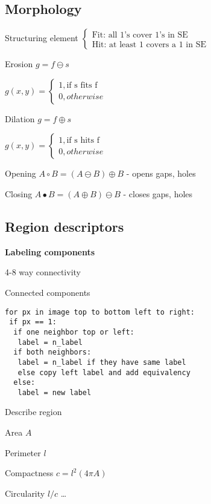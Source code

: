 \documentclass{article}
\begin{document}
\begin{multicols*}{2}
{\subsection{Morphology}

Structuring element
$\begin{cases}
	\text{Fit: all 1's cover 1's in SE} \\
	\text{Hit: at least 1 covers a 1 in SE}
\end{cases}$

\begin{compactitem}
	\item Erosion $g = f \ominus s$
	
	$g(x,y) = \begin{cases}
		1, \text{if s fits f} \\
		0, otherwise
	\end{cases}$

	\item Dilation $g = f \oplus s$
	
	$g(x,y) = \begin{cases}
		1, \text{if s hits f} \\
		0, otherwise
	\end{cases}$

	\item Opening $A \circ B = (A \ominus B) \oplus B$
	- opens gaps, holes
	
	\item Closing $A \bullet B = (A \oplus B) \ominus B$
	- closes gaps, holes
\end{compactitem}

\subsection{Region descriptors}

\textbf{Labeling components}

\begin{compactitem}
	\item 4-8 way connectivity
	\item Connected components
	\begin{lstlisting}
for px in image top to bottom left to right:
 if px == 1:
  if one neighbor top or left:
   label = n_label
  if both neighbors:
   label = n_label if they have same label
   else copy left label and add equivalency
  else:
   label = new label
	\end{lstlisting}

	\item Describe region
	\begin{compactitem}
		\item Area $A$
		\item Perimeter $l$
		\item Compactness $c = l^2(4 \pi A)$
		\item Circularity $l/c$
		\dots
	\end{compactitem}
\end{compactitem}

}
\end{multicols*}
\end{document}
